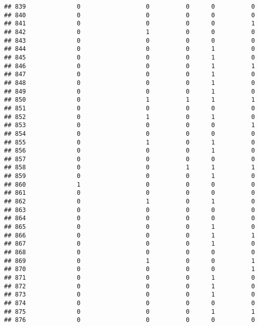 \documentclass[
]{article}
\begin{document}
\begin{verbatim}
## 839              0                  0          0      0          0
## 840              0                  0          0      0          0
## 841              0                  0          0      0          1
## 842              0                  1          0      0          0
## 843              0                  0          0      0          0
## 844              0                  0          0      1          0
## 845              0                  0          0      1          0
## 846              0                  0          0      1          1
## 847              0                  0          0      1          0
## 848              0                  0          0      1          0
## 849              0                  0          0      1          0
## 850              0                  1          1      1          1
## 851              0                  0          0      0          0
## 852              0                  1          0      1          0
## 853              0                  0          0      0          1
## 854              0                  0          0      0          0
## 855              0                  1          0      1          0
## 856              0                  0          0      1          0
## 857              0                  0          0      0          0
## 858              0                  0          1      1          1
## 859              0                  0          0      1          0
## 860              1                  0          0      0          0
## 861              0                  0          0      0          0
## 862              0                  1          0      1          0
## 863              0                  0          0      0          0
## 864              0                  0          0      0          0
## 865              0                  0          0      1          0
## 866              0                  0          0      1          1
## 867              0                  0          0      1          0
## 868              0                  0          0      0          0
## 869              0                  1          0      0          1
## 870              0                  0          0      0          1
## 871              0                  0          0      1          0
## 872              0                  0          0      1          0
## 873              0                  0          0      1          0
## 874              0                  0          0      0          0
## 875              0                  0          0      1          1
## 876              0                  0          0      0          0

\end{verbatim}
\end{document}
